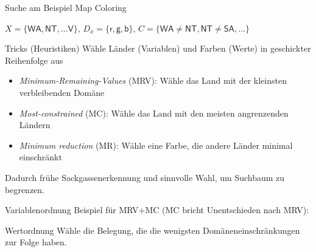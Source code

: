 \begin{frame}{Suche am Beispiel Map Coloring}
\begin{center}
\def\svgwidth{.55\columnwidth}

\end{center}

$X = \{ \mathsf{WA}, \mathsf{NT}, \ldots \mathsf{V} \}$, $D_x = \{\mathsf{r}, \mathsf{g}, \mathsf{b} \}$, $C = \{
\mathsf{WA} \neq \mathsf{NT}, \mathsf{NT} \neq \mathsf{SA}, \ldots  \}$


\end{frame}



\begin{frame}{Tricks (Heuristiken)}
Wähle Länder (Variablen) und Farben (Werte) in \alert{geschickter} Reihenfolge aus


\begin{itemize}
\item \emph{Minimum-Remaining-Values} (MRV): Wähle das Land mit der kleinsten verbleibenden Domäne 
\item \emph{Most-constrained} (MC): Wähle das Land mit den meisten angrenzenden Ländern
\item \emph{Minimum reduction} (MR): Wähle eine Farbe, die andere Länder minimal einschränkt
\end{itemize}

Dadurch frühe Sackgassenerkennung und sinnvolle Wahl, um Suchbaum zu begrenzen.
\end{frame}

\begin{frame}{Variablenordnung}
Beispiel für MRV+MC (MC bricht Unentschieden nach MRV):


\end{frame}

\begin{frame}{Wertordnung}
Wähle die Belegung, die
die wenigsten Domäneneinschränkungen zur Folge haben.
\begin{center}
\end{center}
\end{frame}